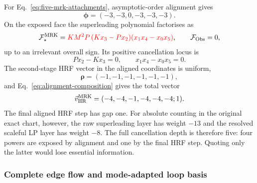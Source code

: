 \documentclass[a4paper,11pt]{article}
\newcommand{\FObs}{\mathcal F_{\rm Obs}}
\newcommand{\vHR}{\vec v_{\rm HR}}
\newcommand{\SLcolour}[1]{{\color{red}#1}}
\begin{document}
For Eq.~\eqref{eq:five-mrk-attachments}, asymptotic-order alignment gives
\begin{equation}
 \boldsymbol\phi=(-3,-3,0,-3,-3,-3).
 \label{eq:five-mrk-alignment-vector}
\end{equation}
On the exposed face the superleading polynomial factorises as
\begin{equation}
 \mathcal F_\star^{\rm MRK}
 =\SLcolour{KM^2P\,(Kx_3-Px_2)(x_1x_4-x_0x_5)},
 \qquad \FObs=0,
 \label{eq:five-mrk-aligned-polynomial}
\end{equation}
up to an irrelevant overall sign.  Its positive cancellation locus is
\begin{equation}
 Px_2-Kx_3=0,\qquad x_1x_4-x_0x_5=0.
 \label{eq:five-mrk-cancellation-locus}
\end{equation}
The second-stage HRF vector in the aligned coordinates is uniform,
\begin{equation}
 \boldsymbol\rho=(-1,-1,-1,-1,-1,-1),
 \label{eq:five-mrk-second-vector}
\end{equation}
and Eq.~\eqref{eq:alignment-composition} gives the total vector
\begin{equation}
 \vHR^{\rm MRK}=(-4,-4,-1,-4,-4,-4;1).
 \label{eq:five-mrk-total-vector}
\end{equation}
The final aligned HRF step has gap one.  For absolute counting in the
original exact chart, however, the raw superleading layer has weight \(-13\)
and the resolved scaleful LP layer has weight \(-8\).  The full cancellation
depth is therefore five: four powers are exposed by alignment and one by the
final HRF step.  Quoting only the latter would lose essential information.

\subsubsection*{Complete edge flow and mode-adapted loop basis}
\end{document}
